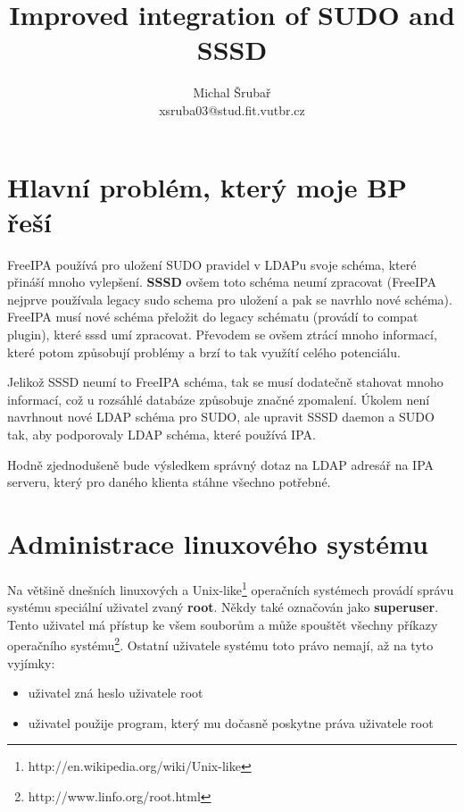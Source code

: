 \documentclass[12pt,a4paper,titlepage,final]{article}
\begin{document}
\author{Michal Šrubař\\xsruba03@stud.fit.vutbr.cz}
\date{}	
\title{Improved integration of SUDO and SSSD}
\maketitle
%

\pagestyle{plain}
\setcounter{page}{1}
\tableofcontents

\newpage
\pagestyle{plain}
\setcounter{page}{1}

\section*{Hlavní problém, který moje BP řeší}
FreeIPA používá pro uložení SUDO pravidel v LDAPu svoje schéma, které přináší
mnoho vylepšení. \textbf{SSSD} ovšem toto schéma neumí zpracovat (FreeIPA
nejprve používala legacy sudo schema pro uložení a pak se navrhlo nové schéma).
FreeIPA musí nové schéma přeložit do legacy schématu (provádí to compat plugin),
které sssd umí zpracovat. Převodem se ovšem ztrácí mnoho informací, které potom
způsobují problémy a brzí to tak využítí celého potenciálu.

Jelikož SSSD neumí to FreeIPA schéma, tak se musí dodatečně stahovat mnoho
informací, což u rozsáhlé databáze způsobuje značné zpomalení. Úkolem není
navrhnout nové LDAP schéma pro SUDO, ale upravit SSSD daemon a SUDO tak, aby
podporovaly LDAP schéma, které používá IPA.

Hodně zjednodušeně bude výsledkem správný dotaz na LDAP adresář na IPA serveru,
který pro daného klienta stáhne všechno potřebné.


\section{Administrace linuxového systému}
Na většině dnešních linuxových a
Unix-like\footnote{http://en.wikipedia.org/wiki/Unix-like} operačních systémech
provádí správu systému speciální uživatel zvaný \textbf{root}. Někdy také
označován jako \textbf{superuser}. Tento uživatel má přístup ke všem souborům a
může spouštět všechny příkazy operačního
systému\footnote{http://www.linfo.org/root.html}.  Ostatní uživatele systému
toto právo nemají, až na tyto vyjímky: \begin{itemize}
	\item uživatel zná heslo uživatele root
	\item uživatel použije program, který mu dočasně poskytne práva uživatele root
\end{itemize}
\end{document}
